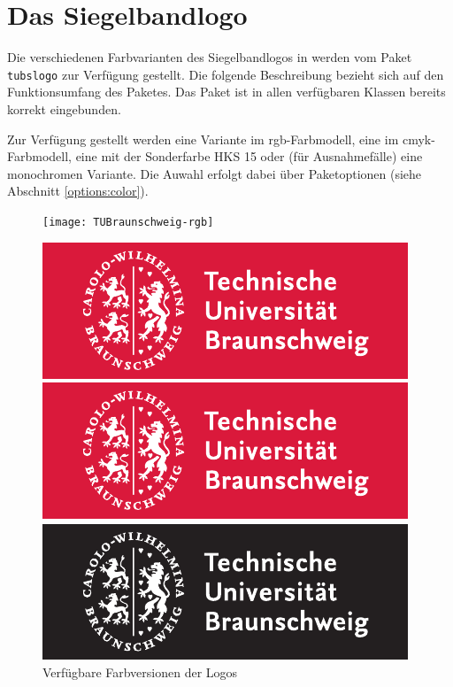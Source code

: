 \chapter{Das Siegelbandlogo}

Die verschiedenen Farbvarianten des Siegelbandlogos in \tubslatex werden
vom Paket \lstinline{tubslogo} zur Verfügung gestellt.
Die folgende Beschreibung bezieht sich auf den Funktionsumfang des Paketes.
Das Paket ist in allen verfügbaren Klassen bereits korrekt eingebunden.

Zur Verfügung gestellt werden eine Variante im rgb-Farbmodell, eine im
cmyk-Farbmodell, eine mit der Sonderfarbe HKS 15 oder (für Ausnahmefälle)
eine monochromen Variante.
Die Auwahl erfolgt dabei über Paketoptionen
(siehe Abschnitt \ref{options:color}).

\begin{figure}[!ht]
\begin{minipage}{0.5\textwidth}
  \centering
  \texttt{[image: TUBraunschweig-rgb]}
\end{minipage}
\begin{minipage}{0.5\textwidth}
  \centering
  \includegraphics[width=\tubslogoBaseWidth]{TUBraunschweig_4C}
\end{minipage}

\begin{minipage}{0.5\textwidth}
  \centering
  \includegraphics[width=\tubslogoBaseWidth]{TUBraunschweig_SC}
\end{minipage}
\begin{minipage}{0.5\textwidth}
  \centering
  \includegraphics[width=\tubslogoBaseWidth]{TUBraunschweig_B}
\end{minipage}
\caption{Verfügbare Farbversionen der Logos}
\end{figure}


